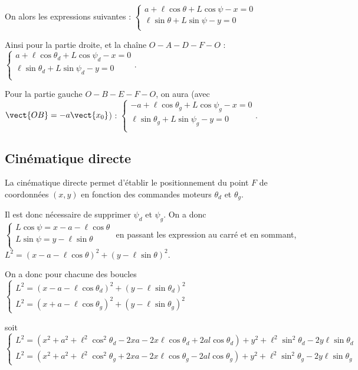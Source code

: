 \documentclass[10pt,fleqn]{article} %
\begin{document}
On alors les expressions suivantes :
$
\left\{
\begin{array}{l}
a+ \ell  \cos\theta +L \cos\psi -x  = 0 \\
\ell   \sin\theta+L\sin\psi -y = 0 \\
\end{array}
\right.
$

Ainsi pour la partie droite, et la chaîne $O - A - D - F - O$ :
$
\left\{
\begin{array}{l}
a+ \ell  \cos\theta_d +L \cos\psi_d   -x  = 0 \\
\ell   \sin\theta_d +L\sin\psi_d  -y = 0 \\
\end{array}
\right.
$.

Pour la partie gauche $O - B- E- F - O$, on aura (avec $\vect{OB}=-a\vect{x_0}$) : 
$
\left\{
\begin{array}{l}
-a+ \ell  \cos\theta_g +L \cos\psi_g   -x  = 0 \\
\ell   \sin\theta_g +L\sin\psi_g  -y = 0 \\
\end{array}
\right.
$.

\subsection{Cinématique directe}
La cinématique directe permet d'établir le positionnement du point $F$ de coordonnées $(x,y)$ en fonction des commandes moteurs $\theta_d$ et $\theta_g$. 

Il est donc nécessaire de supprimer $\psi_d$ et $\psi_g$. On a donc
$
\left\{
\begin{array}{l}
L \cos\psi   = x  -a- \ell  \cos\theta  \\
L\sin\psi = y - \ell   \sin\theta \\
\end{array}
\right.
$ 
en passant les expression au carré et en sommant, 
 $L^2 = \left(x  -a- \ell  \cos\theta \right)^2 + \left( y - \ell   \sin\theta \right)^2$.

On a donc pour chacune des boucles 
$
\left\{
\begin{array}{l}
L^2 = \left(x  -a- \ell  \cos\theta_d \right)^2 + \left( y - \ell   \sin\theta_d \right)^2 \\
L^2 = \left(x  +a- \ell  \cos\theta_g \right)^2 + \left( y - \ell   \sin\theta_g \right)^2
\end{array}
\right.
$ 

soit 
$
\left\{
\begin{array}{l}
L^2 = \left(x^2  +a^2+\ell^2  \cos^2\theta_d  -2xa -2x\ell\cos\theta_d+2al\cos\theta_d  \right) +  y^2 + \ell^2   \sin^2\theta_d- 2y \ell   \sin\theta_d  \\
L^2 = \left(x^2  +a^2+\ell^2  \cos^2\theta_g  +2xa -2x\ell\cos\theta_g-2al\cos\theta_g \right) +  y^2 + \ell^2   \sin^2\theta_g -2y  \ell   \sin\theta_g 
\end{array}
\right.
$ 
\end{document}
